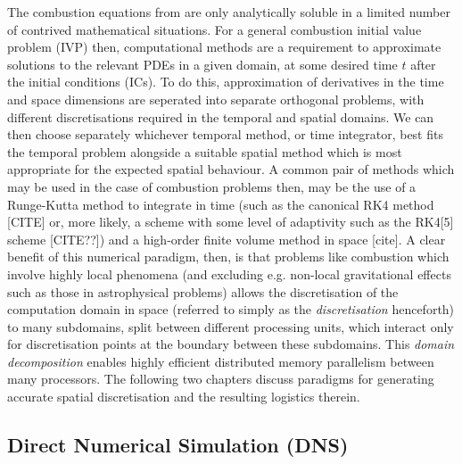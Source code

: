 The combustion equations from  are only analytically soluble in a limited number of contrived mathematical situations. For a general combustion initial value problem (IVP) then, computational methods are a requirement to approximate solutions to the relevant PDEs in a given domain, at some desired time $t$ after the initial conditions (ICs). To do this, approximation of derivatives in the time and space dimensions are seperated into separate orthogonal problems, with different discretisations required in the temporal and spatial domains. We can then choose separately whichever temporal method, or time integrator, best fits the temporal problem alongside a suitable spatial method which is most appropriate for the expected spatial behaviour. A common pair of methods which may be used in the case of combustion problems then, may be the use of a Runge-Kutta method to integrate in time (such as the canonical RK4 method [CITE] or, more likely, a scheme with some level of adaptivity such as the RK4[5] scheme [CITE??]) and a high-order finite volume method in space [cite]. A clear benefit of this numerical paradigm, then, is that problems like combustion which involve highly local phenomena (and excluding e.g. non-local gravitational effects such as those in astrophysical problems) allows the discretisation of the computation domain in space (referred to simply as the \emph{discretisation} henceforth) to many subdomains, split between different processing units, which interact only for discretisation points at the boundary between these subdomains. This \emph{domain decomposition} enables highly efficient distributed memory parallelism between many processors. The following two chapters discuss paradigms for generating accurate spatial discretisation and the resulting logistics therein.





\subsection{Direct Numerical Simulation (DNS)}

